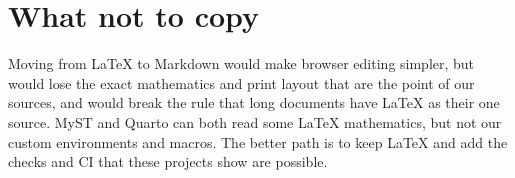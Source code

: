 \section{What not to copy}

Moving from LaTeX to Markdown would make browser editing simpler, but would lose the exact mathematics and print layout that are the point of our sources, and would break the rule that long documents have LaTeX as their one source. MyST and Quarto can both read some LaTeX mathematics, but not our custom environments and macros. The better path is to keep LaTeX and add the checks and CI that these projects show are possible.
